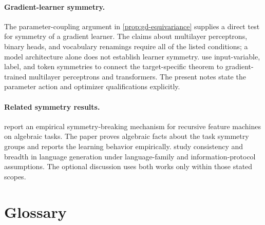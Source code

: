 \documentclass[11pt,twoside]{article}
\theoremstyle{definition}
\theoremstyle{remark}
\begin{document}
\paragraph{Gradient-learner symmetry.}
The parameter-coupling argument in \cref{prop:gd-equivariance} supplies a
direct test for symmetry of a gradient learner. The claims about multilayer
perceptrons, binary heads, and vocabulary renamings require all of the listed
conditions; a model architecture alone does not establish learner symmetry.
\citet{gyorgy2025} use input-variable, label, and token symmetries to connect
the target-specific theorem to gradient-trained multilayer perceptrons and
transformers. The present notes state the parameter action and optimizer
qualifications explicitly.

\paragraph{Related symmetry results.}
\citet{tomasbernal2026} report an empirical symmetry-breaking mechanism for
recursive feature machines on algebraic tasks. The paper proves algebraic facts
about the task symmetry groups and reports the learning behavior empirically.
\citet{kalavasis2025} study consistency and breadth in language generation
under language-family and information-protocol assumptions. The optional
discussion uses both works only within those stated scopes.

\section*{Glossary}
\end{document}
